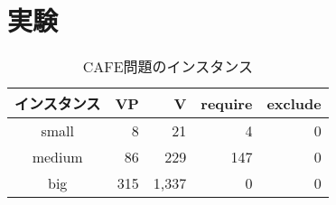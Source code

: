 \section{実験}
\begin{table}[tb]
 \caption{CAFE問題のインスタンス}
 \centering
 \begin{tabular}{crrrr} \bhline
  インスタンス & VP	& V	& require & exclude	\\\hline
  small	    & 8		& 21	& 4	  & 0	        \\
  medium    & 86	& 229	& 147	  & 0	        \\
  big	    & 315	& 1,337	& 0	  & 0        	\\\hline
 \end{tabular}
 \label{tab:instance}
\end{table}

